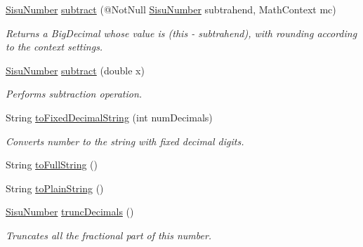 \begin{DoxyCompactItemize}
\hyperlink{classcom_1_1aarrelaakso_1_1drawl_1_1_sisu_number}{Sisu\+Number} \hyperlink{classcom_1_1aarrelaakso_1_1drawl_1_1_sisu_number_a6a5933bb34e557cd07fd96abf51a3433}{subtract} (@Not\+Null \hyperlink{classcom_1_1aarrelaakso_1_1drawl_1_1_sisu_number}{Sisu\+Number} subtrahend, Math\+Context mc)
\begin{DoxyCompactList}\small\item\em Returns a Big\+Decimal whose value is (this -\/ subtrahend), with rounding according to the context settings. \end{DoxyCompactList}\item 
\hyperlink{classcom_1_1aarrelaakso_1_1drawl_1_1_sisu_number}{Sisu\+Number} \hyperlink{classcom_1_1aarrelaakso_1_1drawl_1_1_sisu_number_a16d6415b9c006f6d27a8ad5c60e77d03}{subtract} (double x)
\begin{DoxyCompactList}\small\item\em Performs subtraction operation. \end{DoxyCompactList}\item 
String \hyperlink{classcom_1_1aarrelaakso_1_1drawl_1_1_sisu_number_a3d8585ae00c288b063998e0c65950333}{to\+Fixed\+Decimal\+String} (int num\+Decimals)
\begin{DoxyCompactList}\small\item\em Converts number to the string with fixed decimal digits. \end{DoxyCompactList}\item 
String \hyperlink{classcom_1_1aarrelaakso_1_1drawl_1_1_sisu_number_af92a070f5f79dbd684b2c1b8cf423c6f}{to\+Full\+String} ()
\item 
String \hyperlink{classcom_1_1aarrelaakso_1_1drawl_1_1_sisu_number_af5251e6a7d1f5ed6762394384f2ec604}{to\+Plain\+String} ()
\item 
\hyperlink{classcom_1_1aarrelaakso_1_1drawl_1_1_sisu_number}{Sisu\+Number} \hyperlink{classcom_1_1aarrelaakso_1_1drawl_1_1_sisu_number_ad237bd3a51bc78b3e8cf78d53c1d09c9}{trunc\+Decimals} ()
\begin{DoxyCompactList}\small\item\em Truncates all the fractional part of this number. \end{DoxyCompactList}\end{DoxyCompactItemize}
